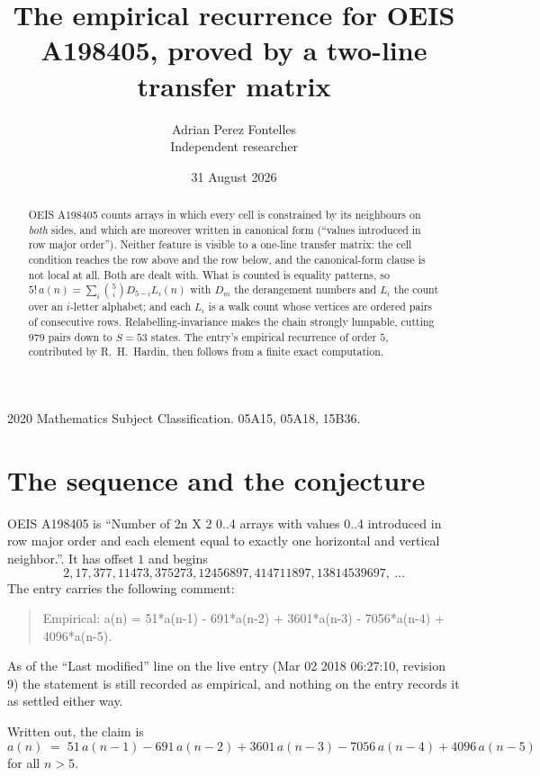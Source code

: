 \documentclass[11pt,a4paper]{article}
\title{The empirical recurrence for OEIS A198405, proved by a two-line transfer matrix}
\author{Adrian Perez Fontelles\\ \small Independent researcher}
\date{31 August 2026}
\theoremstyle{plain}
\theoremstyle{definition}
\begin{document}
\maketitle

\begin{abstract}
OEIS A198405 counts arrays in which every cell is constrained by its neighbours on \emph{both}
sides, and which are moreover written in canonical form (``values introduced in row major
order''). Neither feature is visible to a one-line transfer matrix: the cell condition
reaches the row above and the row below, and the canonical-form clause is not local at
all. Both are dealt with. What is counted is equality patterns, so
$5!\,a(n)=\sum_i\binom{5}{i}D_{5-i}L_i(n)$ with $D_m$ the derangement numbers and
$L_i$ the count over an $i$-letter alphabet; and each $L_i$ is a walk count whose vertices
are ordered pairs of consecutive rows. Relabelling-invariance makes the chain strongly
lumpable, cutting $979$ pairs down to $S=53$ states. The entry's empirical recurrence of
order $5$, contributed by R.~H.~Hardin, then follows from a finite exact computation.
\end{abstract}

\noindent\small 2020 Mathematics Subject Classification. 05A15, 05A18, 15B36.\normalsize

\section{The sequence and the conjecture}

OEIS A198405 is ``Number of 2n X 2 0..4 arrays with values 0..4 introduced in row major order and each element equal to exactly one horizontal and vertical neighbor.''. It has offset $1$ and begins
\[
2, 17, 377, 11473, 375273, 12456897, 414711897, 13814539697,\ \dots
\]
The entry carries the following comment:
\begin{quote}\small
Empirical: a(n) = 51*a(n-1) - 691*a(n-2) + 3601*a(n-3) - 7056*a(n-4) + 4096*a(n-5).
\end{quote}
As of the ``Last modified'' line on the live entry (Mar 02 2018 06:27:10, revision 9) the statement is
still recorded as empirical, and nothing on the entry records it as settled either way.

Written out, the claim is
\begin{equation}\label{eq:conj}
a(n)\;=\;51\,a(n-1) - 691\,a(n-2) + 3601\,a(n-3) - 7056\,a(n-4) + 4096\,a(n-5)
\end{equation}
for all $n>5$.
\end{document}
